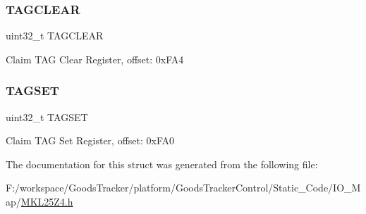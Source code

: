 \mbox{\label{struct_m_t_b___mem_map_a770a2c3d064a4ccfac867429f7b677da}} 
\subsubsection{\texorpdfstring{T\+A\+G\+C\+L\+E\+AR}{TAGCLEAR}}
{\footnotesize\ttfamily uint32\+\_\+t T\+A\+G\+C\+L\+E\+AR}

Claim T\+AG Clear Register, offset\+: 0x\+F\+A4 \mbox{\label{struct_m_t_b___mem_map_a64be91040ad6f82ba46ef20d9f4f9dcf}} 
\subsubsection{\texorpdfstring{T\+A\+G\+S\+ET}{TAGSET}}
{\footnotesize\ttfamily uint32\+\_\+t T\+A\+G\+S\+ET}

Claim T\+AG Set Register, offset\+: 0x\+F\+A0 

The documentation for this struct was generated from the following file\+:\begin{DoxyCompactItemize}
\item 
F\+:/workspace/\+Goods\+Tracker/platform/\+Goods\+Tracker\+Control/\+Static\+\_\+\+Code/\+I\+O\+\_\+\+Map/\hyperlink{_m_k_l25_z4_8h}{M\+K\+L25\+Z4.\+h}\end{DoxyCompactItemize}

